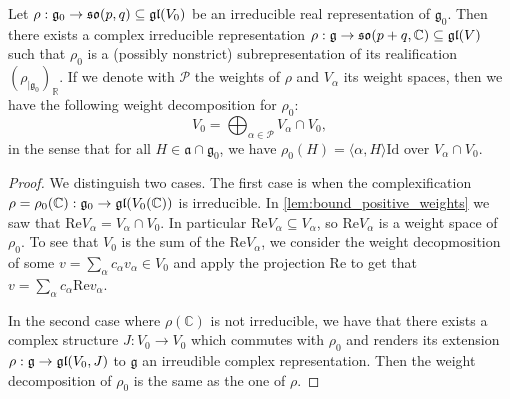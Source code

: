 \documentclass{report}
\begin{document}
\begin{itemize}
\begin{lemma}
        Let $\rho: \mathfrak g_0 \to \operatorname{{\mathfrak{so}}}(p,q) \subseteq \mathfrak{gl}(V_0)$ be an irreducible real representation of $\mathfrak g_0$.
        Then there exists a complex irreducible representation $\rho: \mathfrak g \to \operatorname{{\mathfrak{so}}}(p+q, \mathbb C) \subseteq \operatorname{{\mathfrak{gl}}}(V)$ such that $\rho_0$ is a (possibly nonstrict) subrepresentation of its realification $\left(\rho_{|\mathfrak g_0}\right)_\mathbb R$.
        If we denote with $\mathcal P$ the weights of $\rho$ and $V_\alpha$ its weight spaces, then we have the following weight decomposition for $\rho_0$:
        \[
        V_0 = \bigoplus_{\alpha \in \mathcal P} V_\alpha \cap V_0,
        \]
        in the sense that for all $H \in \mathfrak a \cap \mathfrak g_0$, we have $\rho_0(H) = \langle \alpha, H \rangle \mathrm{Id}$ over $V_\alpha \cap V_0$.
    \end{lemma}
    \begin{proof}
        We distinguish two cases.
        The first case is when the complexification $\rho = \rho_0(\mathbb C): \mathfrak g_0 \to \operatorname{{\mathfrak{gl}}}(V_0(\mathbb C))$ is irreducible.
        In \cref{lem:bound_positive_weights} we saw that $\mathrm{Re}V_\alpha = V_\alpha \cap V_0$.
        In particular $\mathrm{Re}V_\alpha \subseteq V_\alpha$, so $\mathrm{Re}V_\alpha$ is a weight space of $\rho_0$.
        To see that $V_0$ is the sum of the $\mathrm{Re}V_\alpha$, we consider the weight decopmosition of some $v = \sum_\alpha c_\alpha v_\alpha \in V_0$ and apply the projection $\mathrm{Re}$ to get that $v = \sum_\alpha c_\alpha \mathrm{Re}v_\alpha$.

        In the second case where $\rho(\mathbb C)$ is not irreducible, we have that there exists a complex structure $J: V_0 \to V_0$ which commutes with $\rho_0$ and renders its extension $\rho: \mathfrak g \to \operatorname{{\mathfrak{gl}}}(V_0, J)$ to $\mathfrak g$ an irreudible complex representation.
        Then the weight decomposition of $\rho_0$ is the same as the one of $\rho$.
    \end{proof}
\end{itemize}
\end{document}
